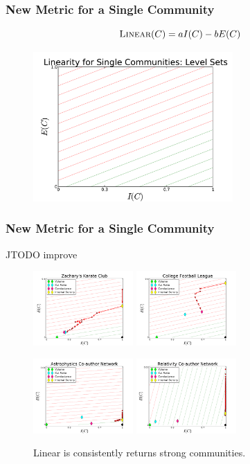 \documentclass{beamer}
\begin{document}
\begin{frame}\frametitle{New Metric for a Single Community}

\begin{block}{}
\begin{center}
\begin{equation}
\mbox{\sc Linear}(C) = a I(C) - b E(C) \nonumber
\end{equation}
\end{center}
\end{block}
\begin{figure}
\includegraphics[width=3in]{Figures/linear_single_ls}
\end{figure}
\end{frame}


\begin{frame}\frametitle{New Metric for a Single Community}

JTODO improve
\begin{figure}
\includegraphics[width=1.5in]{Figures/linear_single_karate}
\includegraphics[width=1.5in]{Figures/linear_single_cfl}

\includegraphics[width=1.5in]{Figures/linear_single_astro}
\includegraphics[width=1.5in]{Figures/linear_single_relativity}
\caption{Linear is consistently returns strong communities.}
\end{figure}
\end{frame}
\end{document}
